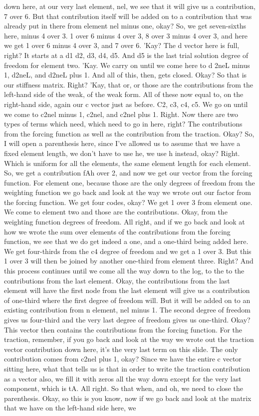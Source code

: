 \documentclass[10pt]{article}
\begin{document}
{down here, at our very last element, nel, we see that it will give us a contribution, 7 over 6. But that contribution itself will be added on to a contribution that was already put in there from element nel minus one, okay? So, we get seven-sixths here, minus 4 over 3. 1 over 6 minus 4 over 3, 8 over 3 minus 4 over 3, and here we get 1 over 6 minus 4 over 3, and 7 over 6. 'Kay? The d vector here is full, right? It starts at a d1 d2, d3, d4, d5. And d5 is the last trial solution degree of freedom for element two. 'Kay. We carry on until we come here to d 2neL minus 1, d2neL, and d2neL plus 1. And all of this, then, gets closed. Okay? So that is our stiffness matrix. Right? 'Kay, that or, or those are the contributions from the left-hand side of the weak, of the weak form. All of these now equal to, on the right-hand side, again our c vector just as before. C2, c3, c4, c5. We go on until we come to c2nel minus 1, c2nel, and c2nel plus 1. Right. Now there are two types of terms which need, which need to go in here, right? The contributions from the forcing function as well as the contribution from the traction. Okay? So, I will open a parenthesis here, since I've allowed us to assume that we have a fixed element length, we don't have to use he, we use h instead, okay? Right. Which is uniform for all the elements, the same element length for each element. So, we get a contribution fAh over 2, and now we get our vector from the forcing function. For element one, because those are the only degrees of freedom from the weighting function we go back and look at the way we wrote out our factor from the forcing function. We get four codes, okay? We get 1 over 3 from element one. We come to element two and those are the contributions. Okay, from the weighting function degrees of freedom. All right, and if we go back and look at how we wrote the sum over elements of the contributions from the forcing function, we see that we do get indeed a one, and a one-third being added here. We get four-thirds from the c4 degree of freedom and we get a 1 over 3. But this 1 over 3 will then be joined by another one-third from element three. Right? And this process continues until we come all the way down to the log, to the to the contributions from the last element. Okay, the contributions from the last element will have the first node from the last element will give us a contribution of one-third where the first degree of freedom will. But it will be added on to an existing contribution from n element, nel minus 1. The second degree of freedom gives us four-third and the very last degree of freedom gives us one-third. Okay? This vector then contains the contributions from the forcing function. For the traction, remember, if you go back and look at the way we wrote out the traction vector contribution down here, it's the very last term on this slide. The only contribution comes from c2nel plus 1, okay? Since we have the entire c vector sitting here, what that tells us is that in order to write the traction contribution as a vector also, we fill it with zeros all the way down except for the very last component, which is tA. All right. So that when, and oh, we need to close the parenthesis. Okay, so this is you know, now if we go back and look at the matrix that we have on the left-hand side here, we }
\end{document}
